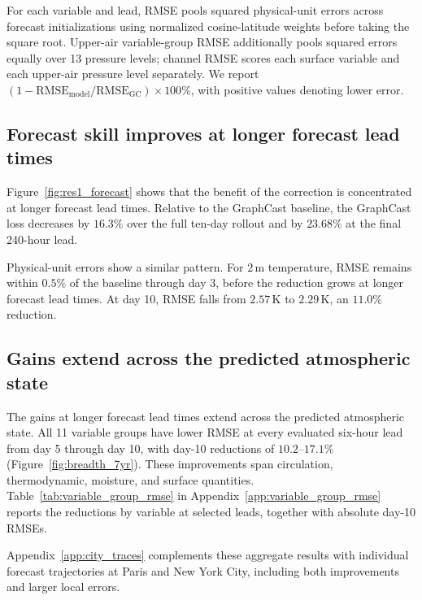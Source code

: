 \documentclass{article}
\newcommand{\codexedit}[1]{#1}
\begin{document}
For each variable and lead, RMSE pools squared physical-unit errors across forecast initializations using normalized cosine-latitude weights before taking the square root. Upper-air variable-group RMSE additionally pools squared errors equally over 13 pressure levels; channel RMSE scores each surface variable and each upper-air pressure level separately. We report $(1-\mathrm{RMSE}_{\mathrm{model}}/\mathrm{RMSE}_{\mathrm{GC}})\times 100\%$, with positive values denoting lower error.

\subsection{Forecast skill improves at longer forecast lead times}

Figure~\ref{fig:res1_forecast} shows that the benefit of the correction is concentrated at longer forecast lead times. Relative to the GraphCast baseline, the {GraphCast loss} decreases by $16.3\%$ over the full ten-day rollout and by $23.68\%$ at the final 240-hour lead.

Physical-unit errors show a similar pattern. For $2$\,m temperature, RMSE remains within $0.5\%$ of the baseline through day 3, before the reduction grows at longer forecast lead times. At day 10, RMSE falls from $2.57$\,K to $2.29$\,K, an $11.0\%$ reduction.


\subsection{Gains extend across the predicted atmospheric state}
{The gains at longer forecast lead times extend across the predicted atmospheric state. All 11 variable groups have lower RMSE at every evaluated six-hour lead from day 5 through day 10, with day-10 reductions of $10.2$--$17.1\%$ (Figure~\ref{fig:breadth_7yr}). These improvements span circulation, thermodynamic, moisture, and surface quantities. Table~\ref{tab:variable_group_rmse} in Appendix~\ref{app:variable_group_rmse} reports the reductions by variable at selected leads, together with absolute day-10 RMSEs.}


{Appendix~\ref{app:city_traces} complements these aggregate results with individual forecast trajectories at Paris and New York City, including both improvements and larger local errors.}
\end{document}
